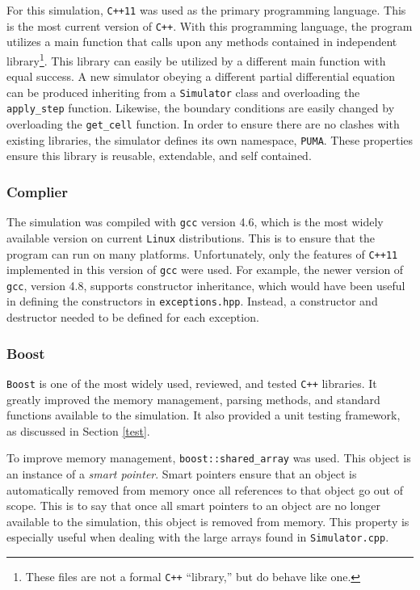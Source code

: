 \documentclass[a4paper,11pt]{article}
\begin{document}
For this simulation, \texttt{C++11} was used as the primary programming language.  This is the most current version of \texttt{C++}.  With this programming language, the program utilizes a main function that calls upon any methods contained in independent library\footnote{These files are not a formal \texttt{C++} ``library,'' but do behave like one.}.  This library can easily be utilized by a different main function with equal success.  A new simulator obeying a different partial differential equation can be produced inheriting from a \texttt{Simulator} class and overloading the \texttt{apply\_step} function.  Likewise, the boundary conditions are easily changed by overloading the \texttt{get\_cell} function.  In order to ensure there are no clashes with existing libraries, the simulator defines its own namespace, \texttt{PUMA}.  These properties ensure this library is reusable, extendable, and self contained.  

\subsubsection{Complier}

The simulation was compiled with \texttt{gcc} version 4.6, which is the most widely available version on current \texttt{Linux} distributions.  This is to ensure that the program can run on many platforms.  Unfortunately, only the features of \texttt{C++11} implemented in this version of \texttt{gcc} were used.  For example, the newer version of \texttt{gcc}, version 4.8, supports constructor inheritance, which would have been useful in defining the constructors in \texttt{exceptions.hpp}.  Instead, a constructor and destructor needed to be defined for each exception. 


\subsubsection{Boost}

\texttt{Boost} is one of the most widely used, reviewed, and tested \texttt{C++} libraries.  It greatly improved the memory management, parsing methods, and standard functions  available to the simulation.   It also provided a unit testing framework, as discussed in Section \ref{test}.  

To improve memory management, \texttt{boost::shared\_array} was used.  This object is an instance of a \emph{smart pointer}.  Smart pointers ensure that an object is automatically removed from memory once all references to that object go out of scope.  This is to say that once all smart pointers to an object are no longer available to the simulation, this object is removed from memory.  This property is especially useful when dealing with the large arrays found in \texttt{Simulator.cpp}.  
\end{document}
